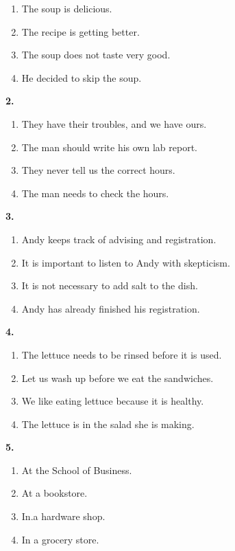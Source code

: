 \documentclass[12pt]{article}
\begin{document}
\begin{enumerate}[label=(\Alph*),leftmargin=*,itemsep=0.2em]
\item The soup is delicious.
\item The recipe is getting better.
\item The soup does not taste very good.
\item He decided to skip the soup.
\end{enumerate}
\par
\vspace{0.25\baselineskip}
\noindent\textbf{2.}
\begin{enumerate}[label=(\Alph*),leftmargin=*,itemsep=0.2em]
\item They have their troubles, and we have ours.
\item The man should write his own lab report.
\item They never tell us the correct hours.
\item The man needs to check the hours.
\end{enumerate}
\par
\vspace{0.25\baselineskip}
\noindent\textbf{3.}
\begin{enumerate}[label=(\Alph*),leftmargin=*,itemsep=0.2em]
\item Andy keeps track of advising and registration.
\item It is important to listen to Andy with skepticism.
\item It is not necessary to add salt to the dish.
\item Andy has already finished his registration.
\end{enumerate}
\par
\vspace{0.25\baselineskip}
\noindent\textbf{4.}
\begin{enumerate}[label=(\Alph*),leftmargin=*,itemsep=0.2em]
\item The lettuce needs to be rinsed before it is used.
\item Let us wash up before we eat the sandwiches.
\item We like eating lettuce because it is healthy.
\item The lettuce is in the salad she is making.
\end{enumerate}
\par
\vspace{0.25\baselineskip}
\noindent\textbf{5.}
\begin{enumerate}[label=(\Alph*),leftmargin=*,itemsep=0.2em]
\item At the School of Business.
\item At a bookstore.
\item In.a hardware shop.
\item In a grocery store.
\end{enumerate}
\end{document}
